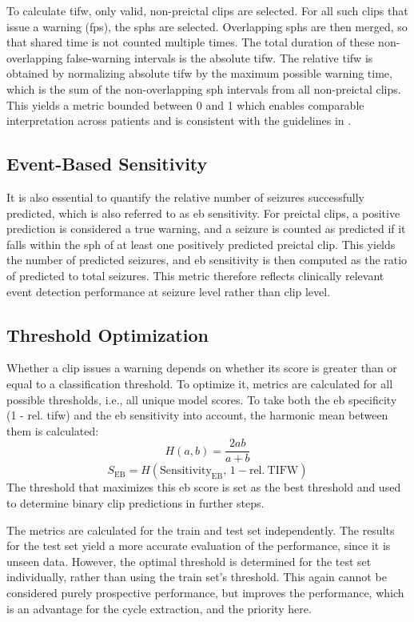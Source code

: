 To calculate \gls{tifw}, only valid, non-preictal clips are selected.
For all such clips that issue a warning (\glspl{fp}), the \glspl{sph} are selected.
Overlapping \glspl{sph} are then merged, so that shared time is not counted multiple times.
The total duration of these non-overlapping false-warning intervals is the absolute \gls{tifw}.
The relative \gls{tifw} is obtained by normalizing absolute \gls{tifw} by the maximum possible warning time, which is the sum of the non-overlapping \gls{sph} intervals from all non-preictal clips.
This yields a metric bounded between 0 and 1 which enables comparable interpretation across patients and is consistent with the guidelines in \textcite{mormann_seizure_2007}.

\subsection{Event-Based Sensitivity} \label{subsec:eb-sensitivity}
It is also essential to quantify the relative number of seizures successfully predicted, which is also referred to as \gls{eb} sensitivity.
For preictal clips, a positive prediction is considered a true warning, and a seizure is counted as predicted if it falls within the \gls{sph} of at least one positively predicted preictal clip.
This yields the number of predicted seizures, and \gls{eb} sensitivity is then computed as the ratio of predicted to total seizures.
This metric therefore reflects clinically relevant event detection performance at seizure level rather than clip level.

\subsection{Threshold Optimization} \label{subsec:threshold-optimization}
Whether a clip issues a warning depends on whether its score is greater than or equal to a classification threshold.
To optimize it, metrics are calculated for all possible thresholds, i.e., all unique model scores.
To take both the \gls{eb} specificity (1 - rel. \gls{tifw}) and the \gls{eb} sensitivity into account, the harmonic mean between them is calculated:
\begin{equation} \label{eq:harmonic-mean}
    H(a,b)=\frac{2ab}{a+b}
\end{equation}
\begin{equation} \label{eq:eb-score}
    S_{\mathrm{EB}} = H\!\left(\mathrm{Sensitivity}_{\mathrm{EB}},\, 1-\mathrm{rel.\ TIFW}\right)
\end{equation}
The threshold that maximizes this \gls{eb} score is set as the best threshold and used to determine binary clip predictions in further steps.

The metrics are calculated for the train and test set independently.
The results for the test set yield a more accurate evaluation of the performance, since it is unseen data.
However, the optimal threshold is determined for the test set individually, rather than using the train set's threshold.
This again cannot be considered purely prospective performance, but improves the performance, which is an advantage for the cycle extraction, and the priority here.
